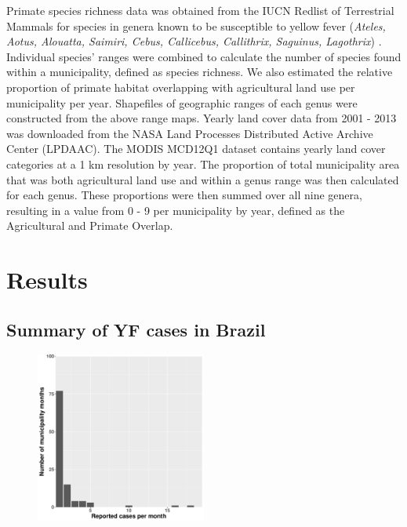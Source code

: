 \documentclass{article}
\begin{document}
Primate species richness data was obtained from the IUCN Redlist of Terrestrial Mammals for species in genera known to be susceptible to yellow fever (\textit{Ateles, Aotus, Alouatta, Saimiri, Cebus, Callicebus, Callithrix, Saguinus, Lagothrix}) \cite{bicca-marques2010,hamrick2017}. Individual species' ranges were combined to calculate the number of species found within a municipality, defined as species richness. We also estimated the relative proportion of primate habitat overlapping with agricultural land use per municipality per year. Shapefiles of geographic ranges of each genus were constructed from the above range maps. Yearly land cover data from 2001 - 2013 was downloaded from the NASA Land Processes Distributed Active Archive Center (LPDAAC). The MODIS MCD12Q1 dataset contains yearly land cover categories at a 1 km resolution by year. The proportion of total municipality area that was both agricultural land use and within a genus range was then calculated for each genus.  These proportions were then summed over all nine genera, resulting in a value from 0 - 9 per municipality by year, defined as the Agricultural and Primate Overlap.



\section*{Results}

\subsection*{Summary of YF cases in Brazil}


\begin{figure} [h]
\centering
\includegraphics[width=0.5\textwidth]{Hist_Reported_Cases}
\caption{}
\label{}
\end{figure}
\end{document}
